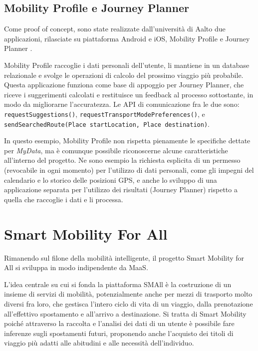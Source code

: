 \subsection{Mobility Profile e Journey Planner}
Come proof of concept, sono state realizzate dall’università di Aalto due applicazioni, rilasciate su piattaforma Android e iOS, Mobility Profile \cite{githubmobilityprofile} e Journey Planner \cite{githubjourneyplanner}.

Mobility Profile raccoglie i dati personali dell’utente, li mantiene in un database relazionale e svolge le operazioni di calcolo del prossimo viaggio pi\`u probabile. Questa applicazione funziona come base di appoggio per Journey Planner, che riceve i suggerimenti calcolati e restituisce un feedback al processo sottostante, in modo da migliorarne l’accuratezza. Le API di comunicazione fra le due sono:
\texttt{requestSuggestions()}, \texttt{requestTransportModePreferences()}, e \texttt{sendSearchedRoute(Place startLocation, Place destination)}.

In questo esempio, Mobility Profile non rispetta pienamente le specifiche dettate per \textit{MyData}, ma \`e comunque possibile riconoscerne alcune caratteristiche all’interno del progetto. Ne sono esempio la richiesta esplicita di un permesso (revocabile in ogni momento) per l’utilizzo di dati personali, come gli impegni del calendario e lo storico delle posizioni GPS, e anche lo sviluppo di una applicazione separata per l’utilizzo dei risultati (Journey Planner) rispetto a quella che raccoglie i dati e li processa.

\section{Smart Mobility For All}
Rimanendo sul filone della mobilità intelligente, il progetto Smart Mobility for All \cite{githubsmall} si sviluppa in modo indipendente da MaaS. 

L’idea centrale su cui si fonda la piattaforma SMAll \`e la costruzione di un insieme di servizi di mobilità, potenzialmente anche per mezzi di trasporto molto diversi fra loro, che gestisca l’intero ciclo di vita di un viaggio, dalla prenotazione all’effettivo spostamento e all’arrivo a destinazione. Si tratta di Smart Mobility poich\'e attraverso la raccolta e l’analisi dei dati di un utente \`e possibile fare inferenze sugli spostamenti futuri, proponendo anche l’acquisto dei titoli di viaggio pi\`u adatti alle abitudini e alle necessità dell’individuo.


